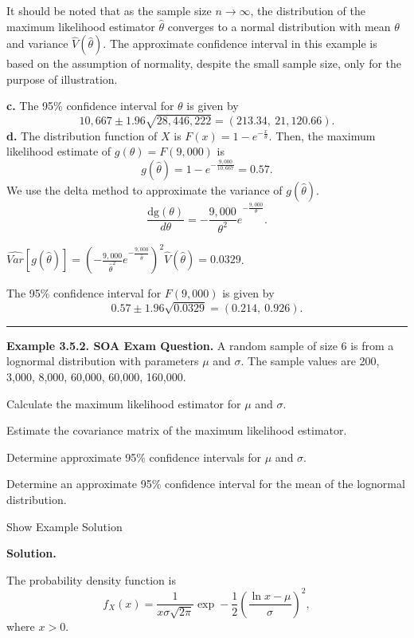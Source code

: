 \documentclass[]{book}
\theoremstyle{definition}
\theoremstyle{definition}
\theoremstyle{definition}
\theoremstyle{remark}
\begin{document}
It should be noted that as the sample size \(n \rightarrow \infty\), the
distribution of the maximum likelihood estimator \(\hat{\theta}\)
converges to a normal distribution with mean \(\theta\) and variance
\(\hat{V}\left( \hat{\theta} \right)\). The approximate confidence
interval in this example is based on the assumption of normality,
despite the small sample size, only for the purpose of illustration.

\textbf{c.} The 95\% confidence interval for \(\theta\) is given by
\[10,667 \pm 1.96\sqrt{28,446,222} = \left( 213.34,\ 21,120.66 \right).\]
\textbf{d.} The distribution function of \(X\) is
\(F\left( x \right) = 1 - e^{- \frac{x}{\theta}}\). Then, the maximum
likelihood estimate of
\(g\left( \theta \right) = F\left( 9,000 \right)\) is
\[g\left( \hat{\theta} \right) = 1 - e^{- \frac{9,000}{10,667}} = 0.57.\]
We use the delta method to approximate the variance of
\(g\left( \hat{\theta} \right)\).
\[\frac{\text{dg}\left( \theta \right)}{d \theta} = {- \frac{9,000}{\theta^{2}}e}^{- \frac{9,000}{\theta}}.\]

\(\widehat{Var}\left\lbrack g\left( \hat{\theta} \right) \right\rbrack = \left( - {\frac{9,000}{{\hat{\theta}}^{2}}e}^{- \frac{9,000}{\hat{\theta}}} \right)^{2}\hat{V}\left( \hat{\theta} \right) = 0.0329\).

The 95\% confidence interval for \(F\left( 9,000 \right)\) is given by
\[0.57 \pm 1.96\sqrt{0.0329} = \left( 0.214,\ 0.926 \right).\]

\begin{center}\rule{0.5\linewidth}{\linethickness}\end{center}

\textbf{Example 3.5.2. SOA Exam Question.} A random sample of size 6 is
from a lognormal distribution with parameters \(\mu\) and \(\sigma\).
The sample values are 200, 3,000, 8,000, 60,000, 60,000, 160,000.

Calculate the maximum likelihood estimator for \(\mu\) and \(\sigma\).

Estimate the covariance matrix of the maximum likelihood estimator.

Determine approximate 95\% confidence intervals for \(\mu\) and
\(\sigma\).

Determine an approximate 95\% confidence interval for the mean of the
lognormal distribution.

Show Example Solution

\hypertarget{toggleExampleLoss.5.2}{}
\textbf{Solution.}

The probability density function is
\[f_{X}\left( x \right) = \frac{1}{x \sigma \sqrt{2\pi}}\exp - \frac{1}{2}\left( \frac{\ln x - \mu}{\sigma} \right)^{2},\]
where \(x > 0\).
\end{document}
